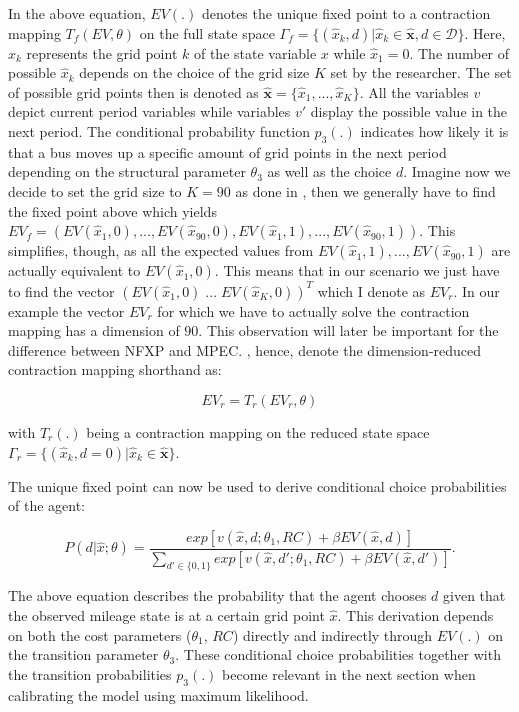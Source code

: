 In the above equation, $EV(.)$ denotes the unique fixed point to a contraction mapping $T_f(EV, \theta)$ on the full state space $\Gamma_f = \{(\hat x_k, d)|\hat x_k \in \mathbf{\hat x}, d \in \mathcal{D}\}$. Here, $\hat x_k$ represents the grid point $k$ of the state variable $x$ while $\hat x_1 = 0$. The number of possible $\hat x_k$ depends on the choice of the grid size $K$ set by the researcher. The set of possible grid points then is denoted as $\mathbf{\hat x} = \{\hat x_1, ..., \hat x_K\}$. All the variables $v$ depict current period variables while variables $v'$ display the possible value in the next period. The conditional probability function $p_3(.)$ indicates how likely it is that a bus moves up a specific amount of grid points in the next period depending on the structural parameter $\theta_3$ as well as the choice $d$. Imagine now we decide to set the grid size to $K=90$ as done in \cite{Rust.1987}, then we generally have to find the fixed point above which yields $EV_f = (EV(\hat x_1, 0), ..., EV(\hat x_{90}, 0), EV(\hat x_1, 1), ..., EV(\hat x_{90}, 1))$. This simplifies, though, as all the expected values from $EV(\hat x_1, 1), ..., EV(\hat x_{90}, 1)$ are actually equivalent to $EV(\hat x_1, 0)$. This means that in our scenario we just have to find the vector $(EV(\hat x_1, 0)\; ...\; EV(\hat x_K, 0))^T$ which I denote as $EV_r$. In our example the vector $EV_r$ for which we have to actually solve the contraction mapping has a dimension of $90$. This observation will later be important for the difference between NFXP and MPEC. \cite{Su.Judd.2012}, hence, denote the dimension-reduced contraction mapping shorthand as:

\begin{equation}
EV_r = T_r(EV_r, \theta)
\end{equation}  

with $T_r(.)$ being a contraction mapping on the reduced state space $\Gamma_r = \{(\hat x_k, d=0)|\hat x_k \in \mathbf{\hat x}\}$.

The unique fixed point can now be used to derive conditional choice probabilities of the agent: 

\begin{equation}
	\label{eq7}
	P(d|\hat x; \theta) = \frac{exp[v(\hat x, d; \theta_1, RC) + \beta EV(\hat x, d)]}{\sum_{d' \in \{0, 1\}} exp[v(\hat x, d'; \theta_1, RC) + \beta EV(\hat x, d')]}.
\end{equation}

The above equation describes the probability that the agent chooses $d$ given that the observed mileage state is at a certain grid point $\hat x$. This derivation depends on both the cost parameters ($\theta_1$, $RC$) directly and indirectly through $EV(.)$ on the transition parameter $\theta_3$. These conditional choice probabilities together with the transition probabilities $p_3(.)$ become relevant in the next section when calibrating the model using maximum likelihood. 


